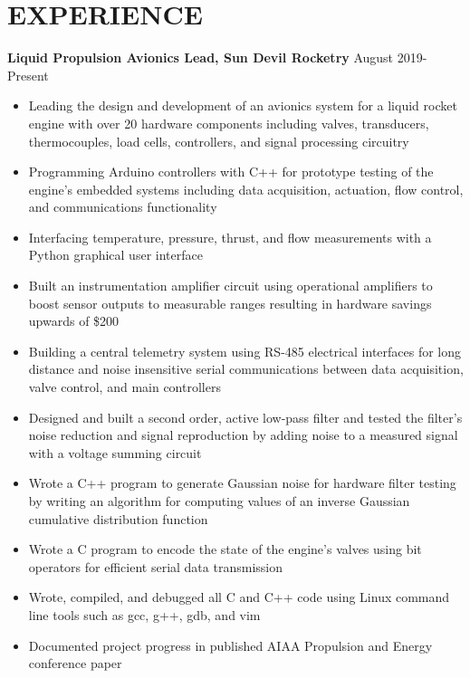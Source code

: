 \documentclass{article}
\begin{document}
\section{EXPERIENCE}
\textbf{Liquid Propulsion Avionics Lead, Sun Devil Rocketry}
\hfill
\vspace{0.5em}
August 2019-Present
\begin{itemize}
	\item{Leading the design and development of an avionics system for a liquid rocket engine with over 20 hardware components including valves, transducers, thermocouples, load cells, controllers, and signal processing circuitry}
	\item{Programming Arduino controllers with C++ for prototype testing of the engine's embedded systems including data acquisition, actuation, flow control, and communications functionality}
	\item{Interfacing temperature, pressure, thrust, and flow measurements with a Python graphical user interface}
	\item{Built an instrumentation amplifier circuit using operational amplifiers to boost sensor outputs to measurable ranges resulting in hardware savings upwards of \$200}
	\item{Building a central telemetry system using RS-485 electrical interfaces for long distance and noise insensitive serial communications between data acquisition, valve control, and main controllers}
	\item{Designed and built a second order, active low-pass filter and tested the filter's noise reduction and signal reproduction by adding noise to a measured signal with a voltage summing circuit}
	\item{Wrote a C++ program to generate Gaussian noise for hardware filter testing by writing an algorithm for computing values of an inverse Gaussian cumulative distribution function}
	\item{Wrote a C program to encode the state of the engine's valves using bit operators for efficient serial data transmission}
	\item{Wrote, compiled, and debugged all C and C++ code using Linux command line tools such as gcc, g++, gdb, and vim}
	\item{Documented project progress in published AIAA Propulsion and Energy conference paper}
\end{itemize}
\end{document}
